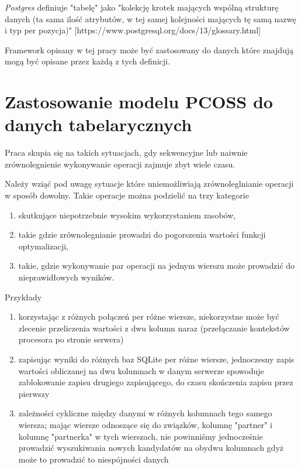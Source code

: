 \documentclass[brudnopis]{xmgr}
\begin{document}
\emph{Postgres} definiuje "tabelę" jako "kolekcję krotek mających wspólną strukturę danych (ta sama ilość atrybutów, w tej samej kolejności mających tę samą nazwę i typ per pozycja)"
[https://www.postgresql.org/docs/13/glossary.html]

Framework opisany w tej pracy może być zastosowany do danych które znajdują mogą być opisane przez każdą z tych definicji.


\chapter{Zastosowanie modelu PCOSS do danych tabelarycznych}

Praca skupia się na takich sytuacjach, gdy sekwencyjne lub naiwnie zrównolegnienie wykonywanie operacji zajmuje zbyt wiele czasu.

Należy wziąć pod uwagę sytuacje które uniemożliwiają zrównoleglnianie operacji w sposób dowolny.
Takie operacje można podzielić na trzy kategorie
\begin{enumerate}
\item skutkujące niepotrzebnie wysokim wykorzystaniem zasobów,
\item takie gdzie zrównolegnianie prowadzi do pogorszenia wartości funkcji optymalizacji,
\item takie, gdzie wykonywanie par operacji na jednym wierszu może prowadzić do nieprawidłowych wyników.
\end{enumerate}

Przykłady
\begin{enumerate}
    \item korzystając z różnych połączeń per różne wiersze, niekorzystne może być zlecenie przeliczenia wartości z dwu kolumn naraz (przełączanie kontekstów procesora po stronie serwera)
    \item zapisując wyniki do różnych baz SQLite per różne wiersze, jednoczesny zapis wartości obliczanej na dwu kolumnach w danym serwerze spowoduje zablokowanie zapisu drugiego zapisującego, do czasu skończenia zapisu przez pierwszy
    \item zależności cykliczne między danymi w różnych kolumnach tego samego wiersza; mając wiersze odnoszące się do związków, kolumnę "partner" i kolumnę "partnerka" w tych wierszach, nie powinniśmy jednocześnie prowadzić wyszukiwania nowych kandydatów na obydwu kolumnach gdyż może to prowadzić to niespójności danych
\end{enumerate}
\end{document}
